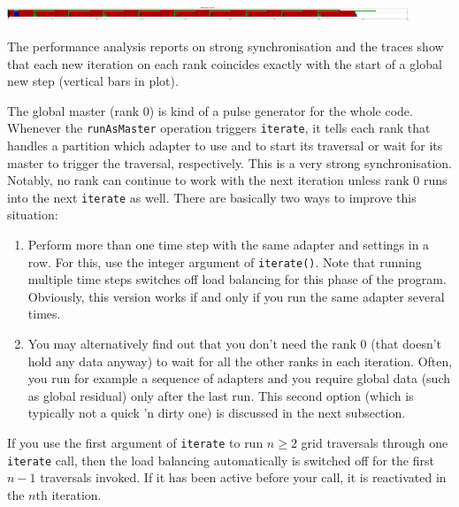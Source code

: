 \begin{center}
  \includegraphics[width=0.9\textwidth]{63_mpi-synchronisation/mpi-phases-after.pdf}
\end{center}


\begin{smell}
The performance analysis reports on strong synchronisation and the traces show
that each new iteration on each rank coincides exactly with the start of a
global new step (vertical bars in plot).
\end{smell}


The global master (rank 0) is kind of a pulse generator for the whole code. 
Whenever the \texttt{runAsMaster} operation triggers \texttt{iterate}, it tells
each rank that handles a partition which adapter to use and to start its
traversal or wait for its master to trigger the traversal, respectively.
This is a very strong synchronisation.
Notably, no rank can continue to work with the next iteration unless rank 0 runs
into the next \texttt{iterate} as well.
There are basically two ways to improve this situation:

\begin{enumerate}
  \item Perform more than one time step with the same adapter and settings in a
  row. For this, use the integer argument of \texttt{iterate()}. Note that
  running multiple time steps switches off load balancing for this phase of the program.
  Obviously, this version works if and only if you run the same adapter several 
  times.
  \item You may alternatively find out that you don't need the rank 0 (that
  doesn't hold any data anyway) to wait for all the other ranks in each
  iteration. Often, you run for example a sequence of adapters and you require
  global data (such as global residual) only after the last run. 
  This second option (which is typically not a quick 'n dirty one) is discussed
  in the next subsection. 
\end{enumerate}

\begin{remark}
 If you use the first argument of \texttt{iterate} to run $n\geq 2$ grid
 traversals through one  \texttt{iterate} call, then the load balancing
 automatically is switched off for the first $n-1$ traversals invoked. If
 it has been active before your call, it is reactivated in the $n$th iteration.
\end{remark}


